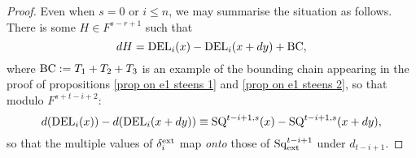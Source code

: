 \documentclass[11pt]{amsart} \renewcommand{\baselinestretch}{1.2}
\theoremstyle{plain}
\newtheorem{cor}[thm]{Corollary}
\numberwithin{equation}{section} %
\theoremstyle{plain}
\newtheorem{cor}[thm]{Corollary}
\numberwithin{equation}{chapter} %
\newcommand{\Sq}{\mathrm{Sq}}
\newcommand{\E}[5]{[E^{#1}_{#2}#3]^{#4}_{#5}}
\begin{document}
\begin{second quadrant homotopy sseq operations}
\begin{proof}
Even when $s=0$ or $i\leq n$, we may summarise the situation as follows. There is some $H\in F^{s-r+1}$ such that
\[
dH
=
\textup{DEL}_i(x)-\textup{DEL}_i(x+dy)+\textup{BC},%
\]
where $\textup{BC}:=T_1+T_2+T_3$ is an example of the bounding chain appearing in the proof of propositions \ref{prop on e1 steens 1} and \ref{prop on e1 steens 2}, so that
modulo $F^{s+t-i+2}$:
\[d(\textup{DEL}_i(x))-d(\textup{DEL}_i(x+dy))
\equiv
\textup{SQ}^{t-i+1,s}(x)-\textup{SQ}^{t-i+1,s}(x+dy),\]
%
so that the multiple values of $\delta_i^\textup{ext}$ map \emph{onto} those of $\Sq_\textup{ext}^{t-i+1}$ under $d_{t-i+1}$.
\end{proof}
%
%


\end{second quadrant homotopy sseq operations}
\end{document}
